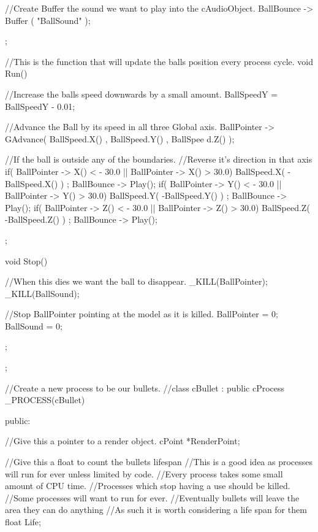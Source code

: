 \begin{DoxyCode}
{{        //Create Buffer the sound we want to play into the cAudioObject.
        BallBounce -> Buffer ( "BallSound" );

        };

        //This is the function that will update the balls position every process 
      cycle.
        void Run()
        {
                //Increase the balls speed downwards by a small amount.
                BallSpeedY = BallSpeedY - 0.01;

                //Advance the Ball by its speed in all three Global axis.
                BallPointer -> GAdvance( BallSpeed.X() , BallSpeed.Y() , BallSpee
      d.Z() );

                //If the ball is outside any of the boundaries.
                //Reverse it's direction in that axis
                if( BallPointer -> X()  < - 30.0  || BallPointer -> X() > 30.0)
                {
                        BallSpeed.X( -BallSpeed.X() ) ;
                        BallBounce -> Play();
                }
                if( BallPointer -> Y()  < - 30.0  || BallPointer -> Y() > 30.0)
                {
                        BallSpeed.Y( -BallSpeed.Y() ) ;
                        BallBounce -> Play();
                }
                if( BallPointer -> Z()  < - 30.0  || BallPointer -> Z() > 30.0)
                {
                        BallSpeed.Z( -BallSpeed.Z() ) ;
                        BallBounce -> Play();
                }

        };

        void Stop()
        {
                //When this dies we want the ball to disappear.
                _KILL(BallPointer);
                _KILL(BallSound);

                //Stop BallPointer pointing at the model as it is killed.
                BallPointer = 0;
                BallSound = 0;
        };
};

//Create a new process to be our bullets.
//class cBullet : public cProcess
_PROCESS(cBullet)
{
 public:

  //Give this a pointer to a render object.
  cPoint *RenderPoint;

  //Give this a float to count the bullets lifespan
  //This is a good idea as processes will run for ever unless limited by code.
  //Every process takes some small amount of CPU time.
  //Processes which stop having a use should be killed.
  //Some processes will want to run for ever.
  //Eventually bullets will leave the area they can do anything
  //As such it is worth considering a life span for them
  float Life;

}
\end{DoxyCode}
